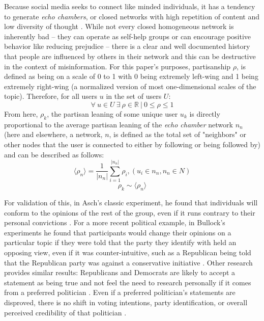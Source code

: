 \documentclass[preprint,review,12pt]{elsarticle}
\begin{document}
Because social media seeks to connect like minded individuals, it has a tendency to generate \textit{echo chambers}, or closed networks with high repetition of content and low diversity of thought \cite{adibi2005proceedings, bastian2009international, pariser2011filter,bozdag2015breaking}. While not every closed homogeneous network is inherently bad -- they can operate as self-help groups \cite{kast2012under} or can encourage positive behavior like reducing prejudice \cite{paluck2011peer} -- there is a clear and well documented history that people are influenced by others in their network \cite{cialdini2004social,bollinger2012peer, bond201261,gerber2008social,gerber2009descriptive,meer2011brother,paluck2012salience,del2016spreading,bessi2015viral,friedkin1984structural,marsden1993network} and this can be destructive in the context of misinformation. For this paper's purposes, partisanship $\rho$, is defined as being on a scale of 0 to 1 with 0 being extremely left-wing and 1 being extremely right-wing (a normalized version of most one-dimensional scales of the topic). Therefore, for all users $u$ in the set of users $U$:
\begin{equation}
\label{basepartisanship}
    \forall \ u \in U \ \exists \ \rho \in \mathbb{R} \ | \ 0 \leq \rho \leq 1
\end{equation}
From here, $\rho_k$, the partisan leaning of some unique user $u_k$ is directly proportional to the average partisan leaning of the \textit{echo chamber} network $n_n$ (here and elsewhere, a network, $n$, is defined as the total set of "neighbors" or other nodes that the user is connected to either by following or being followed by) and can be described as follows:
 \begin{equation}
    \label{ech chamber}
        \langle \rho_n \rangle = \frac{1}{|n_n|}\sum_{i=1}^{|n_n|}{\rho_i}, (u_i \in n_n, n_n \in N)
 \end{equation}
 \begin{equation}
    \label{leaningproportionaltonetwork}
        \rho_k \sim \langle \rho_n \rangle
 \end{equation}
 
 For validation of this, in Asch's classic experiment, he found that individuals will conform to the opinions of the rest of the group, even if it runs contrary to their personal convictions \cite{asch1956studies}. For a more recent political example, in Bullock's experiments he found that participants would change their opinions on a particular topic if they were told that the party they identify with held an opposing view, even if it was counter-intuitive, such as a Republican being told that the Republican party was against a conservative initiative \cite{bullock2007experiments}. Other research provides similar results: Republicans and Democrats are likely to accept a statement as being true and not feel the need to research personally if it comes from a preferred politician \cite{housholder2014facebook}. Even if a preferred politician's statements are disproved, there is no shift in voting intentions, party identification, or overall perceived credibility of that politician \cite{swire2017processing}. 
 
\end{document}
